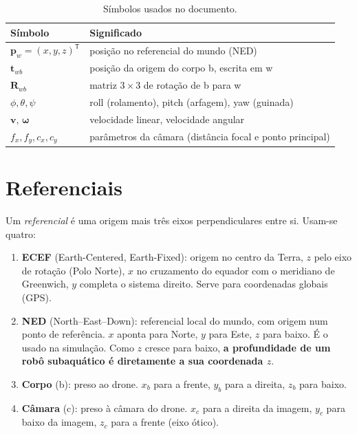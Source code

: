 \documentclass[11pt,a4paper]{article}
\newcommand{\vv}[1]{\mathbf{#1}}              %
\newcommand{\Rot}{\mathbf{R}}
\newcommand{\T}{^{\mathsf{T}}}
\theoremstyle{definition}
\begin{document}
\begin{table}[H]
\centering
\begin{tabular}{ll}
\toprule
Símbolo & Significado\\
\midrule
$\vv{p}_w=(x,y,z)\T$ & posição no referencial do mundo (NED)\\
$\vv{t}_{wb}$ & posição da origem do corpo b, escrita em w\\
$\Rot_{wb}$ & matriz $3\times3$ de rotação de b para w\\
$\phi,\theta,\psi$ & roll (rolamento), pitch (arfagem), yaw (guinada)\\
$\vv{v}$, $\vv{\omega}$ & velocidade linear, velocidade angular\\
$f_x,f_y,c_x,c_y$ & parâmetros da câmara (distância focal e ponto principal)\\
\bottomrule
\end{tabular}
\caption{Símbolos usados no documento.}
\end{table}

\section{Referenciais}
Um \emph{referencial} é uma origem mais três eixos perpendiculares entre si. Usam-se quatro:

\begin{enumerate}
  \item \textbf{ECEF} (Earth-Centered, Earth-Fixed): origem no centro da Terra, $z$ pelo eixo de rotação (Polo Norte), $x$ no cruzamento do equador com o meridiano de Greenwich, $y$ completa o sistema direito. Serve para coordenadas globais (GPS).
  \item \textbf{NED} (North--East--Down): referencial local do mundo, com origem num ponto de referência. $x$ aponta para Norte, $y$ para Este, $z$ para baixo. É o usado na simulação. Como $z$ cresce para baixo, \textbf{a profundidade de um robô subaquático é diretamente a sua coordenada $z$}.
  \item \textbf{Corpo} (b): preso ao drone. $x_b$ para a frente, $y_b$ para a direita, $z_b$ para baixo.
  \item \textbf{Câmara} (c): preso à câmara do drone. $x_c$ para a direita da imagem, $y_c$ para baixo da imagem, $z_c$ para a frente (eixo ótico).
\end{enumerate}
\end{document}
